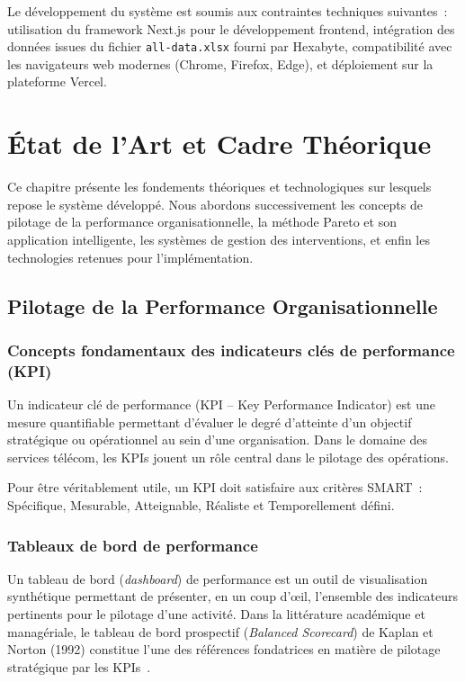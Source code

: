 \documentclass[11pt,a4paper]{report}
\begin{document}
Le développement du système est soumis aux contraintes techniques suivantes~: utilisation du framework Next.js pour le développement frontend, intégration des données issues du fichier \texttt{all-data.xlsx} fourni par Hexabyte, compatibilité avec les navigateurs web modernes (Chrome, Firefox, Edge), et déploiement sur la plateforme Vercel.

\chapter{État de l'Art et Cadre Théorique}

Ce chapitre présente les fondements théoriques et technologiques sur lesquels repose le système développé. Nous abordons successivement les concepts de pilotage de la performance organisationnelle, la méthode Pareto et son application intelligente, les systèmes de gestion des interventions, et enfin les technologies retenues pour l'implémentation.

\section{Pilotage de la Performance Organisationnelle}

\subsection{Concepts fondamentaux des indicateurs clés de performance (KPI)}

Un indicateur clé de performance (KPI -- Key Performance Indicator) est une mesure quantifiable permettant d'évaluer le degré d'atteinte d'un objectif stratégique ou opérationnel au sein d'une organisation. Dans le domaine des services télécom, les KPIs jouent un rôle central dans le pilotage des opérations.

Pour être véritablement utile, un KPI doit satisfaire aux critères SMART~: Spécifique, Mesurable, Atteignable, Réaliste et Temporellement défini.

\subsection{Tableaux de bord de performance}

Un tableau de bord (\textit{dashboard}) de performance est un outil de visualisation synthétique permettant de présenter, en un coup d'œil, l'ensemble des indicateurs pertinents pour le pilotage d'une activité. Dans la littérature académique et managériale, le tableau de bord prospectif (\textit{Balanced Scorecard}) de Kaplan et Norton (1992) constitue l'une des références fondatrices en matière de pilotage stratégique par les KPIs~\cite{kaplan1996}.
\end{document}
